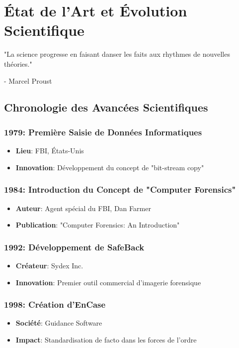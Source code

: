 \chapter{État de l'Art et Évolution Scientifique}
\epigraph{"La science progresse en faisant danser les faits aux rhythmes de nouvelles théories."}{- Marcel Proust}
\section{Chronologie des Avancées Scientifiques}
\subsection{1979: Première Saisie de Données Informatiques}
\begin{itemize}
\item \textbf{Lieu}: FBI, États-Unis
\item \textbf{Innovation}: Développement du concept de "bit-stream copy"
\end{itemize}

\subsection{1984: Introduction du Concept de "Computer Forensics"}
\begin{itemize}
\item \textbf{Auteur}: Agent spécial du FBI, Dan Farmer
\item \textbf{Publication}: "Computer Forensics: An Introduction"
\end{itemize}

\subsection{1992: Développement de SafeBack}
\begin{itemize}
\item \textbf{Créateur}: Sydex Inc.
\item \textbf{Innovation}: Premier outil commercial d'imagerie forensique
\end{itemize}

\subsection{1998: Création d'EnCase}
\begin{itemize}
\item \textbf{Société}: Guidance Software
\item \textbf{Impact}: Standardisation de facto dans les forces de l'ordre
\end{itemize}

